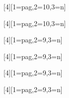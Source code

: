 [4][1=pag,2=10,3=n]{{\fontsize{#2}{1}\selectfont{#4}}}

[4][1=pag,2=10,3=n]{{\color{azulF}\fontsize{#2}{1}\selectfont{#4}}}

[4][1=pag,2=9,3=n]{{\fontsize{#2}{1}\selectfont{#4}}}

[4][1=pag,2=9,3=n]{{\red{}\fontsize{#2}{1}\selectfont{#4}}}

[4][1=pag,2=9,3=n]{{\fontsize{#2}{1}\selectfont{#4}}}

\newcommand{\wfont}[2]{{\fontfamily{#1}\selectfont{#2}}}
\newcommand{\fptm}[1]{{\fontfamily{ptm}\selectfont{#1}}}

[4][1=pag,2=9,3=n]{{\wcelestetxt{}\fontsize{#2}{1}\selectfont{#4}}}

\makeatletter
\renewcommand{\cleardoublepage}{
\clearpage\ifodd\c@page\else
\hbox{}
\vspace*{\fill}
\thispagestyle{empty}
\newpage
\fi}

\usepackage{fancyhdr}
\usepackage[absolute]{textpos}
    \setlength{\TPHorizModule}{10mm}%
    \setlength{\TPVertModule}{10mm}%
    \textblockorigin{0mm}{0mm}%

\renewcommand{\chaptermark}[1]{\markboth{\if@mainmatter\ ~~\fi#1}{}}
\makeatother

